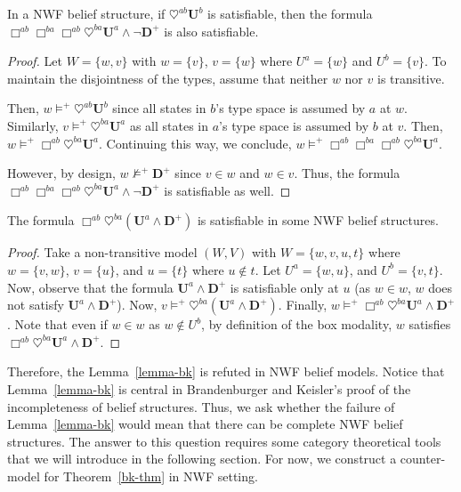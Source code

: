 \documentclass{article}
\begin{document}
\begin{prop}
In a NWF belief structure, if $\heartsuit^{ab} \mathbf{U}^b$ is satisfiable, then the formula $\Box^{ab} \Box^{ba} \Box^{ab} \heartsuit^{ba} \mathbf{U}^a \wedge  \neg \mathbf{D}^{+}$ is also satisfiable.
\end{prop}

\begin{proof}
Let $W = \{ w, v \}$ with $w = \{ v \}$, $v = \{ w \}$ where $U^a = \{ w \}$ and $U^b = \{ v \}$. To maintain the disjointness of the types, assume that neither $w$ nor $v$ is transitive.

Then, $w \models^+ \heartsuit^{ab} \mathbf{U}^b$ since all states in $b$'s type space is assumed by $a$ at $w$. Similarly, $v \models^+ \heartsuit^{ba} \mathbf{U}^a$ as all states in $a$'s type space is assumed by $b$ at $v$. Then, $w \models^+ \Box^{ab} \heartsuit^{ba} \mathbf{U}^a$. Continuing this way, we conclude, $w \models^+ \Box^{ab} \Box^{ba} \Box^{ab} \heartsuit^{ba} \mathbf{U}^a$. 

However, by design, $w \not\models^+ \mathbf{D}^{+}$ since $v \in w$ and $w \in v$. Thus, the formula $\Box^{ab} \Box^{ba} \Box^{ab} \heartsuit^{ba} \mathbf{U}^a \wedge  \neg \mathbf{D}^{+}$ is satisfiable as well.
\end{proof}

\begin{prop}
The formula $\Box^{ab} \heartsuit^{ba} (\mathbf{U}^a \wedge \mathbf{D}^{+})$ is satisfiable in some NWF belief structures.
\end{prop}

\begin{proof}
Take a non-transitive model $(W, V)$ with $W = \{ w, v, u, t\}$ where $w = \{ v, w \}$, $v = \{ u \}$, and $u = \{ t \}$ where $u \notin t$. Let $U^a = \{ w, u\}$, and $U^b = \{ v, t \}$. Now, observe that the formula $\mathbf{U}^a \wedge \mathbf{D}^+$ is satisfiable only at $u$ (as $w \in w$, $w$ does not satisfy $\mathbf{U}^a \wedge \mathbf{D}^+$). Now, $v \models^+ \heartsuit^{ba} (\mathbf{U}^a \wedge \mathbf{D}^+)$. Finally,  $w \models^+ \Box^{ab} \heartsuit^{ba} \mathbf{U}^a \wedge \mathbf{D}^+$. Note that even if $w \in w$ as $w \notin U^b$, by definition of the box modality, $w$ satisfies $\Box^{ab} \heartsuit^{ba} \mathbf{U}^a \wedge \mathbf{D}^+$.
\end{proof}

Therefore, the Lemma~\ref{lemma-bk} is refuted in NWF belief models. Notice that Lemma~\ref{lemma-bk} is central in Brandenburger and Keisler's proof of the incompleteness of belief structures. Thus, we ask whether the failure of Lemma~\ref{lemma-bk} would mean that there can be complete NWF belief structures. The answer to this question requires some category theoretical tools that we will introduce in the following section. For now, we construct a counter-model for Theorem~\ref{bk-thm} in NWF setting.
\end{document}
